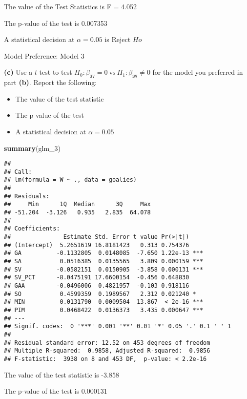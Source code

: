 \documentclass[
]{article}
\newenvironment{Shaded}{\begin{snugshade}}{\end{snugshade}}
\newcommand{\DecValTok}[1]{\textcolor[rgb]{0.00,0.00,0.81}{#1}}
\newcommand{\KeywordTok}[1]{\textcolor[rgb]{0.13,0.29,0.53}{\textbf{#1}}}
\newcommand{\NormalTok}[1]{#1}
\providecommand{\tightlist}{%
  \setlength{\itemsep}{0pt}\setlength{\parskip}{0pt}}
\begin{document}
The value of the Test Statistics is F = 4.052

The p-value of the test is 0.007353

A statistical decision at \(\alpha = 0.05\) is Reject \(Ho\)

Model Preference: Model 3

\textbf{(c)} Use a \(t\)-test to test
\(H_0: \beta_{\texttt{SV}} = 0 \ \text{vs} \ H_1: \beta_{\texttt{SV}} \neq 0\)
for the model you preferred in part \textbf{(b)}. Report the following:

\begin{itemize}
\tightlist
\item
  The value of the test statistic
\item
  The p-value of the test
\item
  A statistical decision at \(\alpha = 0.05\)
\end{itemize}

\begin{Shaded}
\begin{Highlighting}[]
\KeywordTok{summary}\NormalTok{(glm_}\DecValTok{3}\NormalTok{)}
\end{Highlighting}
\end{Shaded}

\begin{verbatim}
## 
## Call:
## lm(formula = W ~ ., data = goalies)
## 
## Residuals:
##     Min      1Q  Median      3Q     Max 
## -51.204  -3.126   0.935   2.835  64.078 
## 
## Coefficients:
##               Estimate Std. Error t value Pr(>|t|)    
## (Intercept)  5.2651619 16.8181423   0.313 0.754376    
## GA          -0.1132805  0.0148085  -7.650 1.22e-13 ***
## SA           0.0516385  0.0135565   3.809 0.000159 ***
## SV          -0.0582151  0.0150905  -3.858 0.000131 ***
## SV_PCT      -8.0475191 17.6600154  -0.456 0.648830    
## GAA         -0.0496006  0.4821957  -0.103 0.918116    
## SO           0.4599359  0.1989567   2.312 0.021240 *  
## MIN          0.0131790  0.0009504  13.867  < 2e-16 ***
## PIM          0.0468422  0.0136373   3.435 0.000647 ***
## ---
## Signif. codes:  0 '***' 0.001 '**' 0.01 '*' 0.05 '.' 0.1 ' ' 1
## 
## Residual standard error: 12.52 on 453 degrees of freedom
## Multiple R-squared:  0.9858, Adjusted R-squared:  0.9856 
## F-statistic:  3938 on 8 and 453 DF,  p-value: < 2.2e-16
\end{verbatim}

The value of the test statistic is -3.858

The p-value of the test is 0.000131
\end{document}

